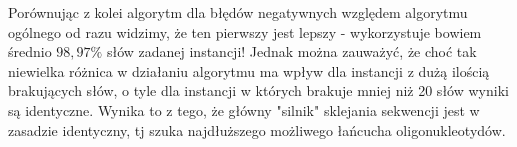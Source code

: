 \documentclass[a4paper,10pt]{article}
\begin{document}
Porównując z kolei algorytm dla błędów negatywnych względem algorytmu ogólnego od razu widzimy, że ten 
pierwszy jest lepszy - wykorzystuje bowiem średnio $98,97\%$ słów zadanej instancji! Jednak można zauważyć,
że choć tak niewielka różnica w działaniu algorytmu ma wpływ dla instancji z dużą ilością brakujących słów, 
o tyle dla instancji w których brakuje mniej niż 20 słów wyniki są identyczne. Wynika to z tego, że główny 
"silnik" sklejania sekwencji jest w zasadzie identyczny, tj szuka najdłuższego możliwego łańcucha oligonukleotydów.
\end{document}
